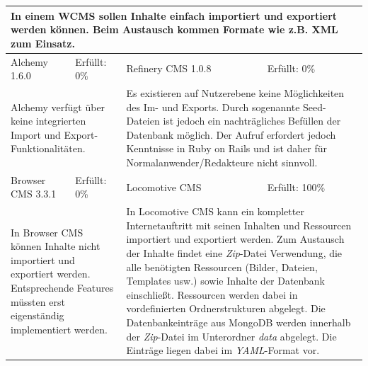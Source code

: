 \begin{tabular}[!ht]{|l|l|l|l|}
\hline
\multicolumn{4}{|p{15cm}|}{\textbf{In einem WCMS sollen Inhalte einfach importiert und exportiert werden können. Beim Austausch kommen Formate wie z.B. XML zum Einsatz.}} \\
\hline
  Alchemy 1.6.0 & \cellcolor{red}Erfüllt: 0\% & Refinery CMS 1.0.8 & \cellcolor{red}Erfüllt: 0\% \\
  \hline
  \multicolumn{2}{|p{7.5cm}|}{Alchemy verfügt über keine integrierten Import und Export-Funktionalitäten.}
   & \multicolumn{2}{p{7.5cm}|}{Es existieren auf Nutzerebene keine Möglichkeiten des Im- und Exports. Durch sogenannte Seed-Dateien ist jedoch ein nachträgliches Befüllen der Datenbank möglich. Der Aufruf erfordert jedoch Kenntnisse in Ruby on Rails und ist daher für Normalanwender/Redakteure nicht sinnvoll.} \\
  \hline
  Browser CMS 3.3.1 & \cellcolor{red}Erfüllt: 0\% & Locomotive CMS & \cellcolor{green}Erfüllt: 100\% \\
  \hline
  \multicolumn{2}{|p{7.5cm}|}{In Browser CMS können Inhalte nicht importiert und exportiert werden. Entsprechende Features müssten erst eigenständig implementiert werden.} & \multicolumn{2}{p{7.5cm}|}{In Locomotive CMS kann ein kompletter Internetauftritt mit seinen Inhalten und Ressourcen importiert und exportiert werden. Zum Austausch der Inhalte findet eine \emph{Zip}-Datei Verwendung, die alle benötigten Ressourcen (Bilder, Dateien, Templates usw.) sowie Inhalte der Datenbank einschließt. Ressourcen werden dabei in vordefinierten Ordnerstrukturen abgelegt. Die Datenbankeinträge aus MongoDB werden innerhalb der \emph{Zip}-Datei im Unterordner \emph{data} abgelegt. Die Einträge liegen dabei  im \emph{YAML}-Format vor.} \\
\hline
\end{tabular}
\newline
\newline
\newline
